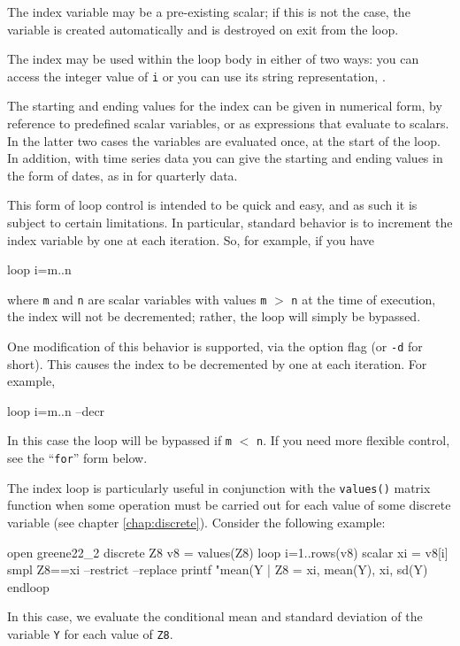 The index variable may be a pre-existing scalar; if this is not the
case, the variable is created automatically and is destroyed on exit
from the loop.

The index may be used within the loop body in either of two ways: you
can access the integer value of \verb+i+ or you can use its string
representation, .

The starting and ending values for the index can be given in numerical
form, by reference to predefined scalar variables, or as expressions
that evaluate to scalars.  In the latter two cases the variables are
evaluated once, at the start of the loop.  In addition, with time
series data you can give the starting and ending values in the form of
dates, as in  for quarterly data.

This form of loop control is intended to be quick and easy, and as
such it is subject to certain limitations. In particular, standard
behavior is to increment the index variable by one at each iteration.
So, for example, if you have
\begin{code}
loop i=m..n
\end{code}
where \texttt{m} and \texttt{n} are scalar variables with values
\texttt{m} $>$ \texttt{n} at the time of execution, the index will not
be decremented; rather, the loop will simply be bypassed.

One modification of this behavior is supported, via the option flag
 (or \texttt{-d} for short). This causes the index to be
decremented by one at each iteration. For example,
\begin{code}
loop i=m..n --decr
\end{code}
In this case the loop will be bypassed if \texttt{m} $<$ \texttt{n}.
If you need more flexible control, see the ``\texttt{for}'' form
below.

The index loop is particularly useful in conjunction with the
\texttt{values()} matrix function when some operation must be carried
out for each value of some discrete variable (see chapter
\ref{chap:discrete}). Consider the following example:

\begin{code}
open greene22_2
discrete Z8
v8 = values(Z8)
loop i=1..rows(v8)
  scalar xi = v8[i]
  smpl Z8==xi --restrict --replace
  printf "mean(Y | Z8 = %
    xi, mean(Y), xi, sd(Y)
endloop
\end{code}

In this case, we evaluate the conditional mean and standard deviation
of the variable \texttt{Y} for each value of \texttt{Z8}.

